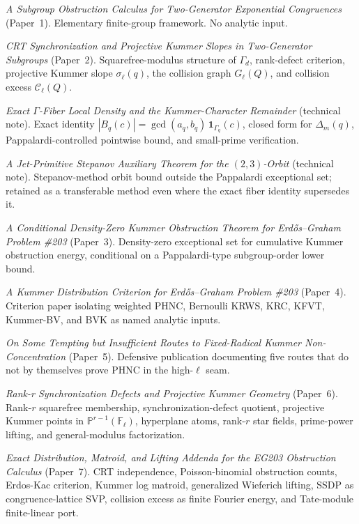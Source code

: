 \documentclass[11pt]{article}
\newcommand{\F}{\mathbb F}
\newcommand{\1}{\mathbf 1}
\begin{document}
\begin{enumerate}[leftmargin=2.5em,label=\textbf{[\arabic*]}]
\item \emph{A Subgroup Obstruction Calculus for Two-Generator Exponential Congruences} (Paper~1).  Elementary finite-group framework.  No analytic input.
\item \emph{CRT Synchronization and Projective Kummer Slopes in Two-Generator Subgroups} (Paper~2).  Squarefree-modulus structure of \(\Gamma_d\), rank-defect criterion, projective Kummer slope \(\sigma_\ell(q)\), the collision graph \(G_\ell(Q)\), and collision excess \(\mathcal C_\ell(Q)\).
\item \emph{Exact \(\Gamma\)-Fiber Local Density and the Kummer-Character Remainder} (technical note).  Exact identity \(|B_q(c)|=\gcd(a_q,b_q)\,\1_{\Gamma_q}(c)\), closed form for \(\Delta_m(q)\), Pappalardi-controlled pointwise bound, and small-prime verification.
\item \emph{A Jet-Primitive Stepanov Auxiliary Theorem for the \((2,3)\)-Orbit} (technical note).  Stepanov-method orbit bound outside the Pappalardi exceptional set; retained as a transferable method even where the exact fiber identity supersedes it.
\item \emph{A Conditional Density-Zero Kummer Obstruction Theorem for Erd\H{o}s--Graham Problem \#203} (Paper~3).  Density-zero exceptional set for cumulative Kummer obstruction energy, conditional on a Pappalardi-type subgroup-order lower bound.
\item \emph{A Kummer Distribution Criterion for Erd\H{o}s--Graham Problem \#203} (Paper~4).  Criterion paper isolating weighted PHNC, Bernoulli KRWS, KRC, KFVT, Kummer-BV, and BVK as named analytic inputs.
\item \emph{On Some Tempting but Insufficient Routes to Fixed-Radical Kummer Non-Concentration} (Paper~5).  Defensive publication documenting five routes that do not by themselves prove PHNC in the high-\(\ell\) seam.
\item \emph{Rank-r Synchronization Defects and Projective Kummer Geometry} (Paper~6).  Rank-\(r\) squarefree membership, synchronization-defect quotient, projective Kummer points in \(\mathbb P^{r-1}(\F_\ell)\), hyperplane atoms, rank-\(r\) star fields, prime-power lifting, and general-modulus factorization.
\item \emph{Exact Distribution, Matroid, and Lifting Addenda for the EG203 Obstruction Calculus} (Paper~7).  CRT independence, Poisson-binomial obstruction counts, Erdos-Kac criterion, Kummer log matroid, generalized Wieferich lifting, SSDP as congruence-lattice SVP, collision excess as finite Fourier energy, and Tate-module finite-linear port.

\end{enumerate}
\end{document}
